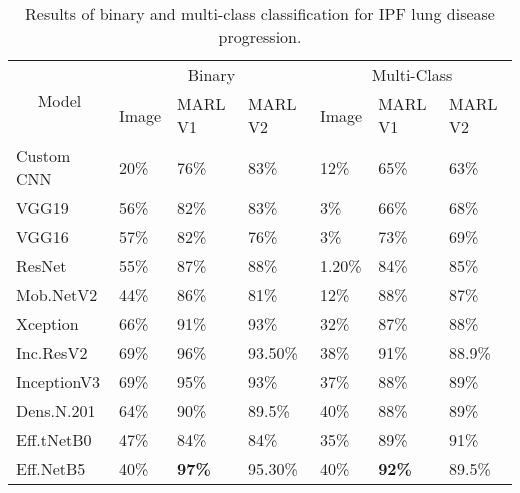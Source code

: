 \documentclass[conference]{IEEEtran}
\begin{document}
\begin{table}[]
\centering
\caption{Results of binary and multi-class classification for IPF lung disease progression.}\label{binary_multi}
\begin{tabular}{|p{2cm}|p{0.5cm}|p{0.6cm}|p{0.6cm}|p{0.5cm}|p{0.6cm}|p{0.6cm}|}
\hline
\multicolumn{1}{|c|}{\multirow{2}{*}{Model}} & \multicolumn{3}{c|}{Binary} & \multicolumn{3}{c|}{Multi-Class} \\ \cline{2-7} 
& Image & MARL V1 & MARL V2 & Image & MARL V1 & 
MARL V2 \\ \hline
Custom CNN & 20\% & 76\% & 83\% & 12\% & 65\% & 63\% \\ \hline
VGG19 \cite{simonyan2014very} & 56\% & 82\% & 83\% & 3\% & 66\% & 68\% \\ \hline
VGG16 \cite{simonyan2014very} & 57\% & 82\% & 76\% & 3\% & 73\% & 69\% \\ \hline
ResNet \cite{he2016deep} & 55\% & 87\% & 88\% & 1.20\% & 84\% & 85\% \\ \hline
Mob.NetV2 \cite{Sandler_2018_CVPR} & 44\% & 86\% & 81\% & 12\% & 88\% & 87\% \\ \hline
Xception \cite{chollet2017xception} & 66\% & 91\% & 93\% & 32\% & 87\% & 88\% \\ \hline
Inc.ResV2 \cite{szegedy2017inception} & 69\% & 96\% & 93.50\% & 38\% & 91\% & 88.9\% \\ \hline
InceptionV3 \cite{szegedy2016rethinking} & 69\% & 95\% & 93\% & 37\% & 88\% & 89\% \\ \hline
Dens.N.201 \cite{huang2017densely} & 64\% & 90\% & 89.5\% & 40\% & 88\% & 89\% \\ \hline
Eff.tNetB0 \cite{tan2019efficientnet} & 47\% & 84\% & 84\% & 35\% & 89\% & 91\% \\ \hline
Eff.NetB5 \cite{tan2019efficientnet} & 40\% & \textbf{97\%} & 95.30\% & 40\% & \textbf{92\%} & 89.5\% \\ \hline
\end{tabular}
\end{table}
\end{document}
